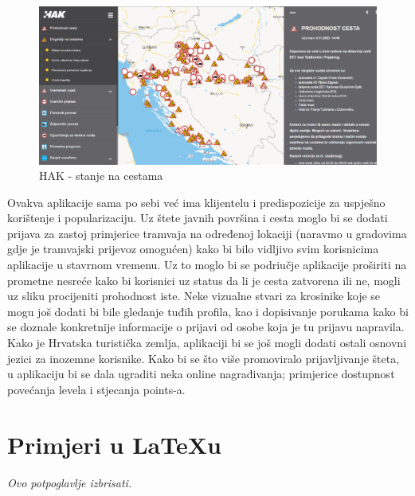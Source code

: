 			
			\begin{figure}[H]
			\includegraphics[scale=0.4]{slike/hak.PNG} %
			\centering
			\caption{HAK - stanje na cestama}
			\label{fig:hak}
		\end{figure}
		
		
		
		Ovakva aplikacije sama po sebi već ima klijentelu i predispozicije za uspješno korištenje i popularizaciju. Uz štete javnih površina i cesta moglo bi se dodati prijava za zastoj primjerice tramvaja na određenoj lokaciji (naravmo u gradovima gdje je tramvajski prijevoz omogućen) kako bi bilo vidljivo svim korisnicima aplikacije u stavrnom vremenu. Uz to moglo bi se podriučje aplikacije proširiti na prometne nesreće kako bi korisnici uz status da li je cesta zatvorena ili ne, mogli uz sliku procijeniti prohodnost iste. Neke vizualne stvari za krosinike koje se mogu još dodati bi bile gledanje tuđih profila, kao i dopisivanje porukama kako bi se doznale konkretnije informacije o prijavi od osobe koja je tu prijavu napravila. Kako je Hrvatska turistička zemlja, aplikaciji bi se još mogli dodati ostali osnovni jezici za inozemne korisnike. Kako bi se što više promoviralo prijavljivanje šteta, u aplikaciju bi se dala ugraditi neka online nagrađivanja; primjerice dostupnost povećanja levela i stjecanja points-a.
		
		
		
		
		
		\section{Primjeri u \LaTeX u}
		
		\textit{Ovo potpoglavlje izbrisati.}\\

